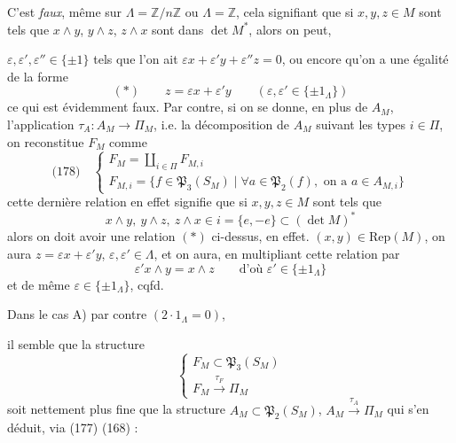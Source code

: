\documentclass[11pt,a4paper]{article}
\begin{document}
C'est  \emph{faux}, même sur $\Lambda=\mathbb{Z}/n\mathbb{Z}$ ou $\Lambda=\mathbb{Z}$, cela signifiant que si $x,y,z\in M$ sont tels que $x\wedge y$, $y\wedge z$, $z\wedge x$ sont dans $\det M^{*}$, alors on peut, \ill{} 

$\varepsilon,\varepsilon',\varepsilon''\in\{\pm1\}$ tels que l'on ait $\varepsilon x+\varepsilon' y+\varepsilon'' z=0$, ou encore qu'on a une égalité de la forme
\[
(*)\qquad z = \varepsilon x+\varepsilon' y \qquad (\varepsilon,\varepsilon'\in\{\pm1_\Lambda\})
\]
ce qui est évidemment faux. Par contre,  si on se donne, en plus de $A_M$, l'application $\tau_A : A_M\to\Pi_M$, i.e. la décomposition de $A_M$ suivant les types $i\in\Pi$, on reconstitue $F_M$ comme
\[
\text{(178)}\quad
\left\{
\begin{array}{l}
F_M = \coprod_{i\in\Pi} F_{M,i}\\[4pt]
F_{M,i} = \{f\in\mathfrak{P}_3(S_M)\mid \forall a\in\mathfrak{P}_2(f), \text{ on a } a\in A_{M,i}\}
\end{array}
\right.
\]
cette dernière relation en effet signifie que si $x,y,z\in M$ sont tels que
\[
x\wedge y,\ y\wedge z,\ z\wedge x \in i=\{e,-e\}\subset(\det M)^{*}
\]
alors on doit avoir une relation $(*)$ ci-dessus, en effet.  $(x,y)\in\mathrm{Rep}(M)$, on aura $z=\varepsilon x+\varepsilon' y$,  $\varepsilon,\varepsilon'\in\Lambda$, et on aura, en multipliant cette relation par 
\[
\varepsilon' x\wedge y = x\wedge z \qquad \text{d'où } \varepsilon'\in\{\pm1_\Lambda\}
\]
et de même $\varepsilon\in\{\pm1_\Lambda\}$, cqfd.

Dans le cas A) par contre $(2\cdot1_\Lambda=0)$,

il semble que la structure
\[
\left\{
\begin{array}{l}
F_M\subset\mathfrak{P}_3(S_M)\\
F_M\xrightarrow{\ \tau_F\ }\Pi_M
\end{array}
\right.
\]
soit nettement plus fine que la structure $A_M\subset\mathfrak{P}_2(S_M)$, $A_M\xrightarrow{\tau_A}\Pi_M$ qui s'en déduit, via (177) (168) : 
\end{document}
